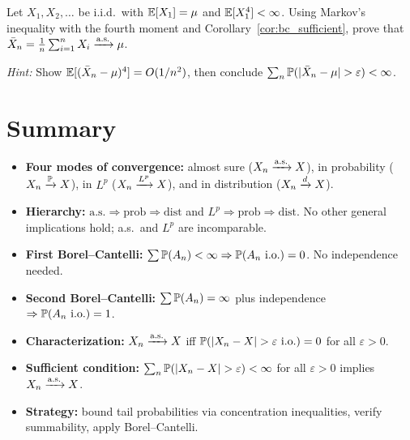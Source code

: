 \documentclass[11pt,a4paper]{article}
\begin{document}
\begin{exercise}[(***)]
\label{ex:sample_avg_as}
Let $X_1, X_2, \ldots$ be i.i.d.\ with $\mathbb{E}[X_1] = \mu$ and
$\mathbb{E}[X_1^4] < \infty$.  Using Markov's inequality with the fourth
moment and Corollary~\ref{cor:bc_sufficient}, prove that
$\bar{X}_n = \frac{1}{n}\sum_{i=1}^n X_i \xrightarrow{\text{a.s.}} \mu$.

\noindent\textit{Hint:} Show $\mathbb{E}[(\bar{X}_n - \mu)^4] = O(1/n^2)$,
then conclude $\sum_n \mathbb{P}(|\bar{X}_n - \mu| > \varepsilon)
< \infty$.
\end{exercise}


\section{Summary}
\label{sec:summary}

\begin{itemize}[nosep]
  \item \textbf{Four modes of convergence:}
    almost sure ($X_n \xrightarrow{\text{a.s.}} X$),
    in probability ($X_n \xrightarrow{\mathbb{P}} X$),
    in $L^p$ ($X_n \xrightarrow{L^{p}} X$),
    and in distribution ($X_n \xrightarrow{d} X$).
  \item \textbf{Hierarchy:}
    $\text{a.s.} \Rightarrow \text{prob} \Rightarrow \text{dist}$
    and
    $L^p \Rightarrow \text{prob} \Rightarrow \text{dist}$.
    No other general implications hold; a.s.\ and $L^p$ are
    incomparable.
  \item \textbf{First Borel--Cantelli:}
    $\sum \mathbb{P}(A_n) < \infty \Rightarrow
    \mathbb{P}(A_n \text{ i.o.}) = 0$.
    No independence needed.
  \item \textbf{Second Borel--Cantelli:}
    $\sum \mathbb{P}(A_n) = \infty$ plus independence $\Rightarrow
    \mathbb{P}(A_n \text{ i.o.}) = 1$.
  \item \textbf{Characterization:}
    $X_n \xrightarrow{\text{a.s.}} X$ iff $\mathbb{P}(|X_n - X| > \varepsilon \text{ i.o.})
    = 0$ for all $\varepsilon > 0$.
  \item \textbf{Sufficient condition:}
    $\sum_n \mathbb{P}(|X_n - X| > \varepsilon) < \infty$ for all
    $\varepsilon > 0$ implies $X_n \xrightarrow{\text{a.s.}} X$.
  \item \textbf{Strategy:} bound tail probabilities via
    concentration inequalities, verify summability, apply
    Borel--Cantelli.
\end{itemize}

\end{document}
